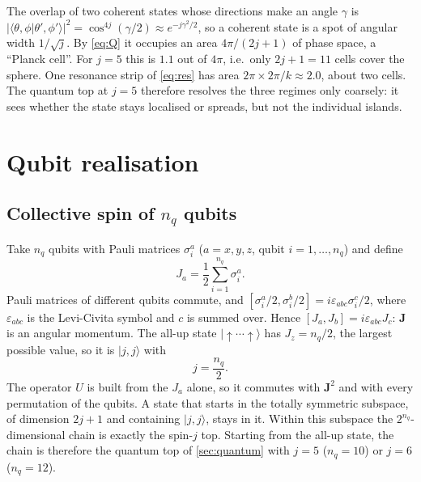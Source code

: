 \documentclass[11pt,a4paper]{article}
\begin{document}
The overlap of two coherent states whose directions make an angle $\gamma$ is
$|\langle\theta,\phi|\theta',\phi'\rangle|^2 = \cos^{4j}(\gamma/2)\approx e^{-j\gamma^2/2}$, so a coherent state is
a spot of angular width $1/\sqrt j$. By \cref{eq:Q} it occupies an area $4\pi/(2j+1)$ of phase space, a ``Planck
cell''. For $j=5$ this is $1.1$ out of $4\pi$, i.e.\ only $2j+1=11$ cells cover the sphere. One resonance strip of
\cref{eq:res} has area $2\pi\times2\pi/k\approx2.0$, about two cells. The quantum top at $j=5$ therefore resolves
the three regimes only coarsely: it sees whether the state stays localised or spreads, but not the individual islands.

\section{Qubit realisation}\label{sec:qubits}

\subsection{Collective spin of \texorpdfstring{$n_q$}{n\_q} qubits}

Take $n_q$ qubits with Pauli matrices $\sigma^a_i$ ($a=x,y,z$, qubit $i=1,\dots,n_q$) and define
\begin{equation}\label{eq:Jq}
  J_a = \frac12\sum_{i=1}^{n_q}\sigma^a_i .
\end{equation}
Pauli matrices of different qubits commute, and $[\sigma^a_i/2,\sigma^b_i/2]=i\varepsilon_{abc}\sigma^c_i/2$, where
$\varepsilon_{abc}$ is the Levi-Civita symbol and $c$ is summed over. Hence $[J_a,J_b]=i\varepsilon_{abc}J_c$: $\bm J$ is
an angular momentum. The all-up state $|{\uparrow\cdots\uparrow}\rangle$ has $J_z=n_q/2$, the largest possible value,
so it is $|j,j\rangle$ with
\begin{equation}
  j = \frac{n_q}{2}.
\end{equation}
The operator $U$ is built from the $J_a$ alone, so it commutes with $\bm J^2$ and with every permutation of the qubits.
A state that starts in the totally symmetric subspace, of dimension $2j+1$ and containing $|j,j\rangle$, stays in it.
Within this subspace the $2^{n_q}$-dimensional chain is exactly the spin-$j$ top. Starting from the all-up state, the
chain is therefore the quantum top of \cref{sec:quantum} with $j=5$ ($n_q=10$) or $j=6$ ($n_q=12$).
\end{document}
